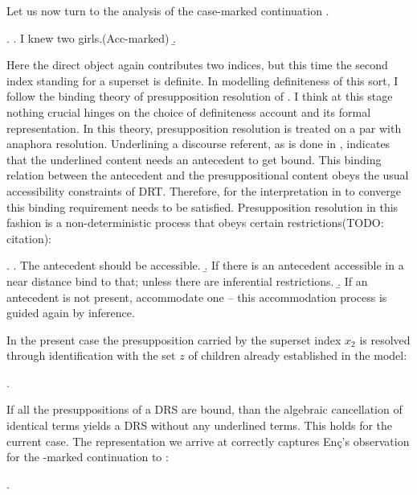 \documentclass[11pt,a4paper]{article}
\begin{document}
Let us now turn to the analysis of the case-marked continuation
.

\ex.\label{exencacc1}
\a. I knew two girls.\hfill (Acc-marked)
\b. 

Here the direct object  again contributes two
indices, but this time the second index standing for a superset is definite. In
modelling definiteness of this sort, I follow the binding theory of
presupposition resolution of . I think at this stage nothing
crucial hinges on the choice of definiteness account and its formal
representation. In this theory, presupposition resolution is treated on a par
with anaphora resolution. Underlining a discourse referent, as is done in
, indicates that the underlined content needs an antecedent to
get bound. This binding relation between the antecedent and the
presuppositional content obeys the usual accessibility constraints of DRT.
Therefore, for the interpretation in  to converge this binding
requirement needs to be satisfied. Presupposition resolution in this fashion is
a non-deterministic process that obeys certain restrictions(TODO:
citation):

\ex.
\a. The antecedent should be accessible.
\b. If there is an antecedent accessible in a near distance bind to that; unless there are inferential restrictions.
\b. If an antecedent is not present, accommodate one -- this accommodation process is guided again by inference.

In the present case the presupposition carried by the superset index $x_2$ is
resolved through identification with the set $z$ of children already
established in the model:

\ex.


If all the presuppositions of a DRS are bound, than the algebraic cancellation of identical terms yields a DRS without any underlined terms. This holds for the current case. The representation we arrive at correctly captures Enç's observation for the \acc-marked continuation to :

\ex.
\end{document}
